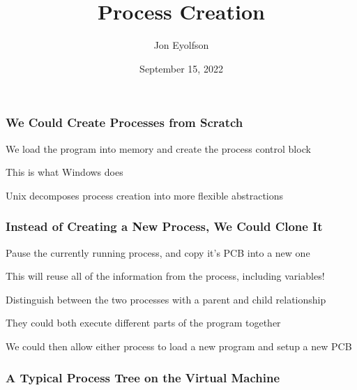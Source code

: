 

\title{Process Creation}
\author{Jon Eyolfson}
\date{September 15, 2022}


  \begin{frame}
    \titlepage
  \end{frame}

  \begin{frame}
    \frametitle{We Could Create Processes from Scratch}

    We load the program into memory and create the process control block

    \vspace{2em}

    This is what Windows does

    \vspace{4em}

    Unix decomposes process creation into more flexible abstractions
  \end{frame}

  \begin{frame}
    \frametitle{Instead of Creating a New Process, We Could Clone It}

    Pause the currently running process, and copy it's PCB into a new one

    \hspace{2em} This will reuse all of the information from the process,
    including variables!

    \vspace{2em}

    Distinguish between the two processes with a parent and child relationship

    \hspace{2em} They could both execute different parts of the program together

    \vspace{4em}

    We could then allow either process to load a new program and setup a new PCB
  \end{frame}

  \begin{frame}
    \frametitle{A Typical Process Tree on the Virtual Machine}

  \end{frame}

